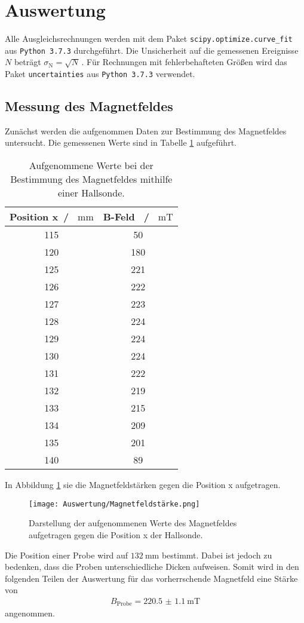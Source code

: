\section{Auswertung}
Alle Ausgleichsrechnungen werden mit dem Paket \texttt{scipy.optimize.curve\_fit}  aus \texttt{Python 3.7.3} durchgeführt.
Die Unsicherheit auf die gemessenen Ereignisse $N$ beträgt $\sigma_\text{N} = \sqrt{N}\,$.
Für Rechnungen mit fehlerbehafteten Größen wird das Paket \texttt{uncertainties} aus \texttt{Python 3.7.3} verwendet.

\subsection{Messung des Magnetfeldes}
Zunächst werden die aufgenommen Daten zur Bestimmung des Magnetfeldes untersucht. Die gemessenen Werte 
sind in Tabelle \ref{tab:MF_Messung} aufgeführt. 
\begin{table}[H]
    \centering
    \caption{Aufgenommene Werte bei der Bestimmung des Magnetfeldes mithilfe einer Hallsonde.}
    \label{tab:MF_Messung}
    \begin{tabular}{cc}
      \toprule
      Position x\, / \, $\si{\milli\meter}$ & B-Feld \, / \, $\si{\milli\tesla}$  \\
      \midrule
      115 & 50  \\
      120 & 180 \\
      125 & 221 \\
      126 & 222 \\
      127 & 223 \\
      128 & 224 \\
      129 & 224 \\
      130 & 224 \\
      131 & 222 \\
      132 & 219 \\
      133 & 215 \\
      134 & 209 \\
      135 & 201 \\
      140 & 89  \\
      \bottomrule
  \end{tabular}
 \end{table} \noindent
 In Abbildung \ref{fig:MF_Messung} sie die Magnetfeldstärken gegen die Position x aufgetragen. 
 \begin{figure}[H]
     \centering
     \texttt{[image: Auswertung/Magnetfeldstärke.png]}
     \caption{Darstellung der aufgenommenen Werte des Magnetfeldes aufgetragen gegen die Position x der Hallsonde.}
     \label{fig:MF_Messung}
 \end{figure} \noindent
 Die Position einer Probe wird auf $\SI{132}{\milli\meter}$ bestimmt. Dabei ist jedoch zu bedenken, 
 dass die Proben unterschiedliche Dicken aufweisen. 
 Somit wird in den folgenden Teilen der Auswertung für das vorherrschende Magnetfeld eine Stärke von 
 \begin{align*}
     B_\text{Probe} = \SI{220.5(11)}{\milli\tesla}
 \end{align*} \noindent
 angenommen. 

